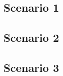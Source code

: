 \documentclass[14pt]{article}
\begin{document}
\subsection{Scenario 1}

\newpage
\subsection{Scenario 2}

\newpage
\subsection{Scenario 3}


\newpage


\end{document}
